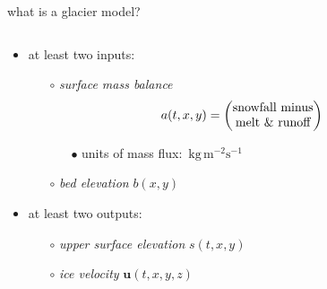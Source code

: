 \documentclass[svgnames,
               hyperref={colorlinks,citecolor=DeepPink4,linkcolor=FireBrick,urlcolor=Maroon},
               usepdftitle=false]  %
               {beamer}
\newcommand{\bu}{\mathbf{u}}
\begin{document}
\begin{frame}{what is a glacier model?}

\begin{columns}
\begin{column}{0.6\textwidth}
\begin{itemize}
\begin{definition}
a \alert{glacier model} is a \underline{map}

which evolves a glacier in a climate
\end{definition} 
\item at least two inputs:
    \begin{itemize}
    \item[$\circ$] \emph{surface mass balance}
$$\hspace{-7mm} a(t,x,y) = \begin{pmatrix}
\text{snowfall minus} \\
\text{melt \& runoff}
\end{pmatrix}$$

\vspace{-3mm}
        \begin{itemize}
        \item[{\scriptsize $\bullet$}] units of mass flux:\, $\text{kg}\, \text{m}^{-2} \text{s}^{-1}$
        \end{itemize}

    \item[$\circ$] \emph{bed elevation} $b(x,y)$
    \end{itemize}
\item at least two outputs:
    \begin{itemize}
    \item[$\circ$] \emph{upper surface elevation} $s(t,x,y)$
    \item[$\circ$] \emph{ice velocity} $\bu(t,x,y,z)$
    \end{itemize}


\end{itemize}
\end{column}
\end{columns}
\end{frame}
\end{document}
